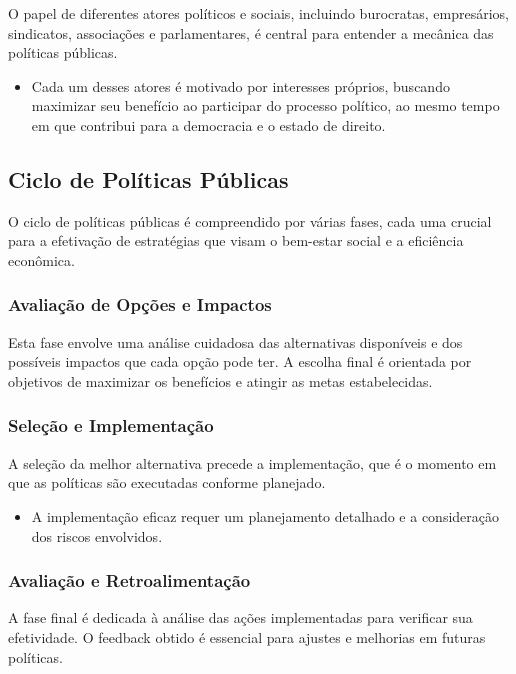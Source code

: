 \documentclass[
   article,       
   12pt,          
   oneside,       
   a4paper,       
   english,       
   brazil,        
   sumario=tradicional
   ]{abntex2}
\begin{document}
O papel de diferentes atores políticos e sociais, incluindo burocratas, empresários, sindicatos, associações e parlamentares, é central para entender a mecânica das políticas públicas.

\begin{itemize}
    \item Cada um desses atores é motivado por interesses próprios, buscando maximizar seu benefício ao participar do processo político, ao mesmo tempo em que contribui para a democracia e o estado de direito.
\end{itemize}

\subsection{Ciclo de Políticas Públicas}

O ciclo de políticas públicas é compreendido por várias fases, cada uma crucial para a efetivação de estratégias que visam o bem-estar social e a eficiência econômica.

\subsubsection{Avaliação de Opções e Impactos}

Esta fase envolve uma análise cuidadosa das alternativas disponíveis e dos possíveis impactos que cada opção pode ter. A escolha final é orientada por objetivos de maximizar os benefícios e atingir as metas estabelecidas.

\subsubsection{Seleção e Implementação}

A seleção da melhor alternativa precede a implementação, que é o momento em que as políticas são executadas conforme planejado.

\begin{itemize}
    \item A implementação eficaz requer um planejamento detalhado e a consideração dos riscos envolvidos.
\end{itemize}

\subsubsection{Avaliação e Retroalimentação}

A fase final é dedicada à análise das ações implementadas para verificar sua efetividade. O feedback obtido é essencial para ajustes e melhorias em futuras políticas.
\end{document}
